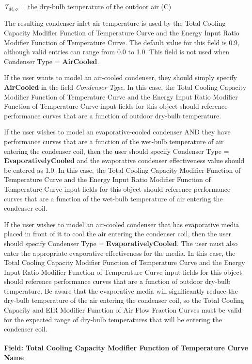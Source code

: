 \emph{T\(_{db,o}\)} = the dry-bulb temperature of the outdoor air (C)

The resulting condenser inlet air temperature is used by the Total Cooling Capacity Modifier Function of Temperature Curve and the Energy Input Ratio Modifier Function of Temperature Curve. The default value for this field is 0.9, although valid entries can range from 0.0 to 1.0. This field is not used when Condenser Type = \textbf{AirCooled}.

If the user wants to model an air-cooled condenser, they should simply specify \textbf{AirCooled} in the field \textit{Condenser Type}. In this case, the Total Cooling Capacity Modifier Function of Temperature Curve and the Energy Input Ratio Modifier Function of Temperature Curve input fields for this object should reference performance curves that are a function of outdoor dry-bulb temperature.

If the user wishes to model an evaporative-cooled condenser AND they have performance curves that are a function of the wet-bulb temperature of air entering the condenser coil, then the user should specify Condenser Type = \textbf{EvaporativelyCooled} and the evaporative condenser effectiveness value should be entered as 1.0. In this case, the Total Cooling Capacity Modifier Function of Temperature Curve and the Energy Input Ratio Modifier Function of Temperature Curve input fields for this object should reference performance curves that are a function of the wet-bulb temperature of air entering the condenser coil.

If the user wishes to model an air-cooled condenser that has evaporative media placed in front of it to cool the air entering the condenser coil, then the user should specify Condenser Type = \textbf{EvaporativelyCooled}. The user must also enter the appropriate evaporative effectiveness for the media. In this case, the Total Cooling Capacity Modifier Function of Temperature Curve and the Energy Input Ratio Modifier Function of Temperature Curve input fields for this object should reference performance curves that are a function of outdoor dry-bulb temperature. Be aware that the evaporative media will significantly reduce the dry-bulb temperature of the air entering the condenser coil, so the Total Cooling Capacity and EIR Modifier Function of Air Flow Fraction Curves must be valid for the expected range of dry-bulb temperatures that will be entering the condenser coil.

\paragraph{Field: Total Cooling Capacity Modifier Function of Temperature Curve Name}\label{field-total-cooling-capacity-function-of-temperature-curve-name}

